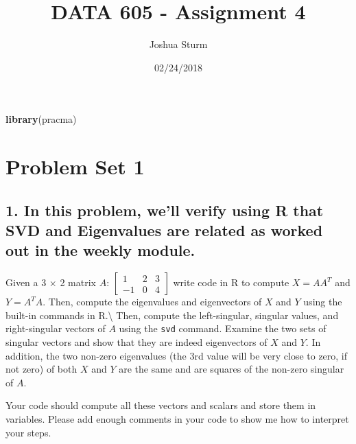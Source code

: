 \documentclass[]{article}
\title{DATA 605 - Assignment 4}
\author{Joshua Sturm}
\date{02/24/2018}
\newenvironment{Shaded}{\begin{snugshade}}{\end{snugshade}}
\newcommand{\KeywordTok}[1]{\textcolor[rgb]{0.13,0.29,0.53}{\textbf{#1}}}
\newcommand{\NormalTok}[1]{#1}
\begin{document}
\maketitle

\begin{Shaded}
\begin{Highlighting}[]
\KeywordTok{library}\NormalTok{(pracma)}
\end{Highlighting}
\end{Shaded}

\section{Problem Set 1}\label{problem-set-1}

\subsection{1. In this problem, we'll verify using R that SVD and
Eigenvalues are related as worked out in the weekly
module.}\label{in-this-problem-well-verify-using-r-that-svd-and-eigenvalues-are-related-as-worked-out-in-the-weekly-module.}

Given a 3 × 2 matrix \(A\):
\(\begin{bmatrix}1 & 2 & 3\\ -1 & 0 & 4\end{bmatrix}\) write code in R
to compute \(X = AA^T\) and \(Y = A^TA\). Then, compute the eigenvalues
and eigenvectors of \(X\) and \(Y\) using the built-in commands in
R.\textbackslash{} Then, compute the left-singular, singular values, and
right-singular vectors of \(A\) using the \texttt{svd} command. Examine
the two sets of singular vectors and show that they are indeed
eigenvectors of \(X\) and \(Y\). In addition, the two non-zero
eigenvalues (the 3rd value will be very close to zero, if not zero) of
both \(X\) and \(Y\) are the same and are squares of the non-zero
singular of \(A\).

Your code should compute all these vectors and scalars and store them in
variables. Please add enough comments in your code to show me how to
interpret your steps.
\end{document}
